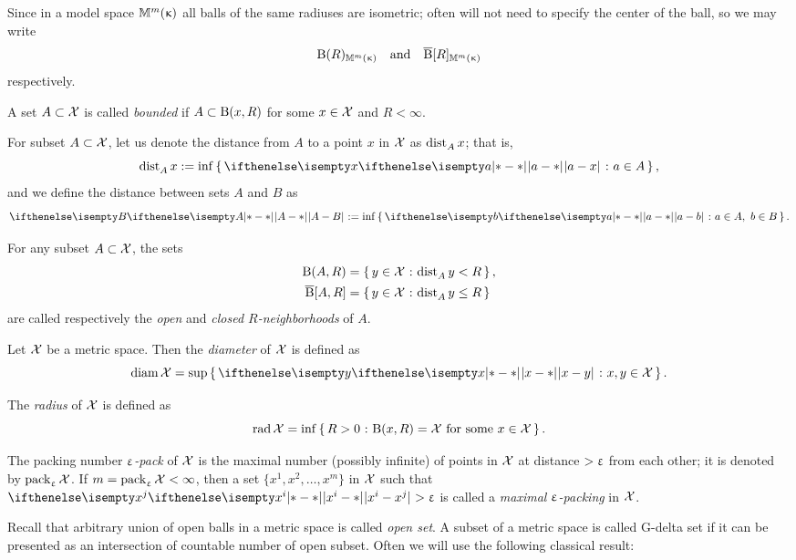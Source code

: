 Since in a model space $\mathbb{M}_{{}}^{m}({\upkappa})$ all balls of the same radiuses are isometric;
often will not need to specify the center of the ball,
so we may write 
\[\mathrm{B}{}(R)_{\mathbb{M}_{{}}^{m}({\upkappa})}\quad\text{and}\quad\overline{\mathrm{B}}{}[R]_{\mathbb{M}_{{}}^{m}({\upkappa})}\] respectively.

A set $A\subset\spc{X}$ is called \emph{bounded} if $A\subset\oBall(x,R)$ for some $x\in\spc{X}$ and $R<\infty$.

For subset $A\subset \spc{X}$, 
let us denote the distance from $A$ to a point $x$ in $\mathcal{X}$ as $\mathop{\rm dist}\nolimits_{A}^{{}}{x}$;
that is,
\[\distfun{A}{x}
\df
\inf\set{\dist{a}{x}{}}{a\in A},\] 
and  %
we define the distance between sets $A$ and $B$  as 
\[\dist{A}{B}{}
\df
\inf\set{\dist{a}{b}{}}{a\in A,\ b\in B}.\]%

For any subset $A\subset\spc{X}$,  the sets
\begin{align*}
\oBall(A,R)&=\set{y\in \spc{X}}{ \distfun{A}{y}{}<R},
\\
\cBall[A,R]&=\set{y\in \spc{X}}{\distfun{A}{y}{}\le R}
\end{align*}
are called respectively the  \emph{open} and \emph{closed $R$-neighborhoods} of $A$.

Let $\mathcal{X}$ be a metric space.
Then the \emph{diameter} of $\mathcal{X}$ is  defined as
\[\diam \spc{X}=\sup\set{\dist{x}{y}{}}{x,y\in \spc{X}}.\]

The \emph{radius} of $\mathcal{X}$ is  defined as
\[\rad \spc{X}=\inf\set{R>0}{\oBall(x,R)= \spc{X}\ \t{for some}\ x\in\spc{X}}.\]

The packing number \emph{$\upvarepsilon$-pack} of $\mathcal{X}$ is the maximal number  (possibly infinite) of points in $\mathcal{X}$ at distance $>\upvarepsilon$ from each other;  it is denoted by $\mathop{\rm pack}\nolimits_\upvarepsilon\mathcal{X}$.
If $m=\mathop{\rm pack}\nolimits_\upvarepsilon\mathcal{X}<\infty$, then a set $\{x^1,x^2,\dots,x^m\}$ in $\mathcal{X}$ 
such that $\dist{x^i}{x^j}{}>\eps$ is called a \emph{maximal $\upvarepsilon$-packing} in $\mathcal{X}$.


Recall that arbitrary union of open balls in a metric space is called \emph{open set}.
A subset of a metric space is called G-delta set if it can be presented as an intersection of countable number of open subset. 
Often we will use the following classical result:

